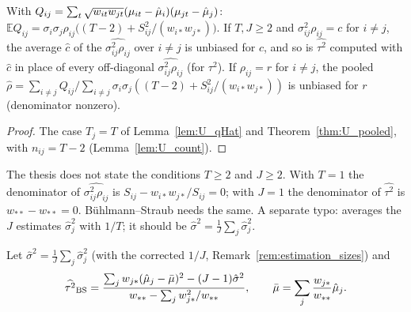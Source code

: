 \begin{corollary}\label{cor:pooled}
  \leanok
  With $Q_{ij} = \sum_t \sqrt{w_{it}w_{jt}}(\mu_{it}-\hat\mu_i)(\mu_{jt}-\hat\mu_j)$:
  $\mathbb{E}Q_{ij} = \sigma_i\sigma_j\rho_{ij}\bigl((T-2) + S_{ij}^2/(w_{i*}w_{j*})\bigr)$.
  If $T, J \ge 2$ and $\sigma^2_{ij}\rho_{ij} = c$ for $i \ne j$, the average $\hat c$ of the
  $\widehat{\sigma^2_{ij}\rho_{ij}}$ over $i \ne j$ is unbiased for $c$, and so is
  $\widehat{\tau^2}$ computed with $\hat c$ in place of every off-diagonal
  $\widehat{\sigma^2_{ij}\rho_{ij}}$ (for $\tau^2$). If $\rho_{ij} = r$ for
  $i \ne j$, the pooled
  $\hat\rho = \sum_{i\ne j}Q_{ij}/\sum_{i\ne j}\sigma_i\sigma_j((T-2) + S_{ij}^2/(w_{i*}w_{j*}))$
  is unbiased for $r$ (denominator nonzero).
\end{corollary}
\begin{proof}
  \leanok
  The case $T_j = T$ of Lemma~\ref{lem:U_qHat} and Theorem~\ref{thm:U_pooled}, with
  $n_{ij} = T - 2$ (Lemma~\ref{lem:U_count}).
\end{proof}

\begin{remark}\label{rem:estimation_sizes}
  The thesis does not state the conditions $T \ge 2$ and $J \ge 2$. With
  $T = 1$ the denominator of $\widehat{\sigma^2_{ij}\rho_{ij}}$ is
  $S_{ij} - w_{i*}w_{j*}/S_{ij} = 0$; with $J = 1$ the denominator of
  $\widehat{\tau^2}$ is $w_{**} - w_{**} = 0$. Bühlmann--Straub needs the same.
  A separate typo:  averages the $J$ estimates $\hat\sigma_j^2$
  with $1/T$; it should be $\hat\sigma^2 = \frac1J\sum_j\hat\sigma_j^2$.
\end{remark}

\begin{definition}\label{def:bs_tauHat}
  \leanok
  Let $\hat\sigma^2 = \frac1J\sum_j\hat\sigma_j^2$ (with the corrected $1/J$,
  Remark~\ref{rem:estimation_sizes}) and
  \[
    \widehat{\tau^2}_{\mathrm{BS}} =
    \frac{\sum_j w_{j*}(\hat\mu_j - \bar\mu)^2 - (J-1)\hat\sigma^2}{w_{**} - \sum_j w_{j*}^2/w_{**}},
    \qquad \bar\mu = \sum_j \frac{w_{j*}}{w_{**}}\hat\mu_j .
  \]
\end{definition}

